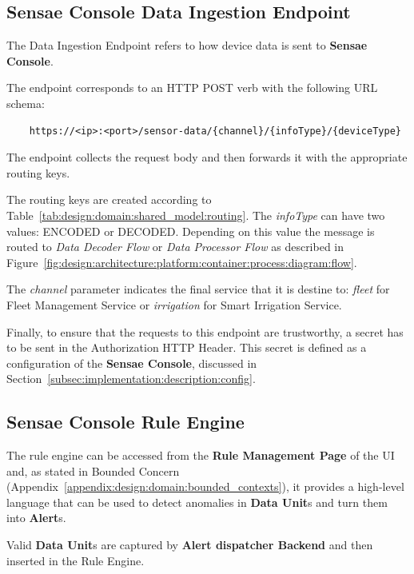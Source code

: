 \subsection{Sensae Console Data Ingestion Endpoint}
\label{subsec:implementation:description:ingestion}

The Data Ingestion Endpoint refers to how device data is sent to \textbf{Sensae Console}.

The endpoint corresponds to an HTTP POST verb with the following \gls{URL} schema:

\begin{verbatim}
    https://<ip>:<port>/sensor-data/{channel}/{infoType}/{deviceType}
\end{verbatim}

The endpoint collects the request body and then forwards it with the appropriate routing keys.

The routing keys are created according to Table~\ref{tab:design:domain:shared_model:routing}. The \textit{infoType} can have two values: ENCODED or DECODED. Depending on this value the message is routed to \textit{Data Decoder Flow} or \textit{Data Processor Flow} as described in Figure~\ref{fig:design:architecture:platform:container:process:diagram:flow}.

The \textit{channel} parameter indicates the final service that it is destine to: \textit{fleet} for Fleet Management Service or \textit{irrigation} for Smart Irrigation Service.

Finally, to ensure that the requests to this endpoint are trustworthy, a secret has to be sent in the Authorization HTTP Header. This secret is defined as a configuration of the \textbf{Sensae Console}, discussed in Section~\ref{subsec:implementation:description:config}.

\subsection{Sensae Console Rule Engine}
\label{subsec:implementation:description:rule}

The rule engine can be accessed from the \textbf{Rule Management Page} of the UI and, as stated in  Bounded Concern (Appendix~\ref{appendix:design:domain:bounded_contexts}), it provides a high-level language that can be used to detect anomalies in \textbf{Data Unit}s and turn them into \textbf{Alert}s.

Valid \textbf{Data Unit}s are captured by \textbf{Alert dispatcher Backend} and then inserted in the Rule Engine.


